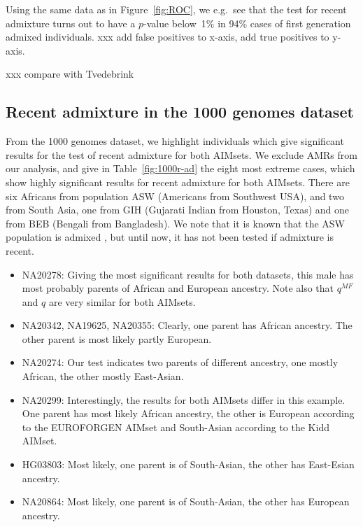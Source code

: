 \documentclass[12pt]{article}
\theoremstyle{definition}
\begin{document}
\begin{table}
  \centering
  
  \caption{Using the same data as in Figure~\ref{fig:ROC}, we e.g.\
    see that the test for recent admixture turns out to have a
    $p$-value below~1\% in 94\% cases of first generation admixed
    individuals. xxx add false positives to x-axis, add true positives
    to y-axis.}
  \label{tab:power}
\end{table}

xxx compare with Tvedebrink

\subsection{Recent admixture in the 1000 genomes dataset}
From the 1000 genomes dataset, we highlight individuals which give
significant results for the test of recent admixture for both
AIMsets. We exclude AMRs from our analysis, and give in
Table~\ref{fig:1000r-ad} the eight most extreme cases, which show
highly significant results for recent admixture for both
AIMsets. There are six Africans from population ASW (Americans from
Southwest USA), and two from South Asia, one from GIH (Gujarati Indian
from Houston, Texas) and one from BEB (Bengali from Bangladesh). We
note that it is known that the ASW population is admixed
\cite{Eduardoff2016}, but until now, it has not been tested if
admixture is recent.

\begin{itemize}
\item NA20278: Giving the most significant results for both datasets,
  this male has most probably parents of African and European
  ancestry. Note also that $q^{MF}$ and $q$ are very similar for both
  AIMsets.
\item NA20342, NA19625, NA20355: Clearly, one parent has African
  ancestry. The other parent is most likely partly European.
\item NA20274: Our test indicates two parents of different ancestry,
  one mostly African, the other mostly East-Asian.
\item NA20299: Interestingly, the results for both AIMsets differ in
  this example. One parent has most likely African ancestry, the other
  is European according to the EUROFORGEN AIMset and South-Asian
  according to the Kidd AIMset.
\item HG03803: Most likely, one parent is of South-Asian, the other
  has East-Esian ancestry.
\item NA20864: Most likely, one parent is of South-Asian, the other
  has European ancestry.
\end{itemize}
\end{document}
